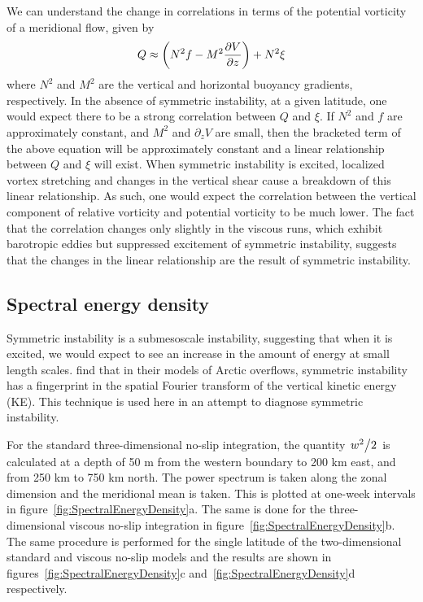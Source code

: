 We can understand the change in correlations in terms of the potential vorticity of a meridional flow, given by
\begin{equation}
    Q \approx \bigg(N^2 f - M^2 \pdv{V}{z} \bigg) + N^2 \xi
\end{equation}
where $N^2$ and $M^2$ are the vertical and horizontal buoyancy gradients, respectively. In the absence of symmetric instability, at a given latitude, one would expect there to be a strong correlation between $Q$ and $\xi$. If $N^2$ and $f$ are approximately constant, and $M^2$ and $\partial_z V$ are small, then the bracketed term of the above equation will be approximately constant and a linear relationship between $Q$ and $\xi$ will exist. When symmetric instability is excited, localized vortex stretching and changes in the vertical shear cause a breakdown of this linear relationship. As such, one would expect the correlation between the vertical component of relative vorticity and potential vorticity to be much lower. The fact that the correlation changes only slightly in the viscous runs, which exhibit barotropic eddies but suppressed excitement of symmetric instability, suggests that the changes in the linear relationship are the result of symmetric instability.

\subsection{Spectral energy density}
Symmetric instability is a submesoscale instability, suggesting that when it is excited, we would expect to see an increase in the amount of energy at small length scales. \citet{Yankovsky2019} find that in their models of Arctic overflows, symmetric instability has a fingerprint in the spatial Fourier transform of the vertical kinetic energy (KE). This technique is used here in an attempt to diagnose symmetric instability.

For the standard three-dimensional no-slip integration, the quantity $\flatfrac{w^2}{2}$ is calculated at a depth of 50 m from the western boundary to 200 km east, and from 250 km to 750 km north. The power spectrum is taken along the zonal dimension and the meridional mean is taken. This is plotted at one-week intervals in figure~\ref{fig:SpectralEnergyDensity}a. The same is done for the three-dimensional viscous no-slip integration in figure~\ref{fig:SpectralEnergyDensity}b. The same procedure is performed for the single latitude of the two-dimensional standard and viscous no-slip models and the results are shown in figures~\ref{fig:SpectralEnergyDensity}c and~\ref{fig:SpectralEnergyDensity}d respectively.

